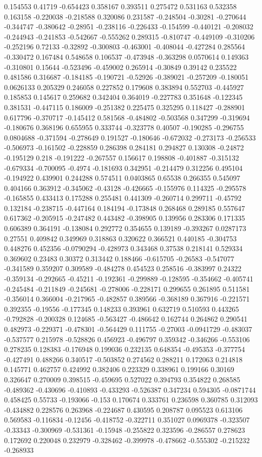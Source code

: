 0.154553 0.41719 -0.654423 0.358167 0.393511 0.275472 0.531163 0.532358 0.163158 -0.220038 -0.218588 0.320086 0.231587 -0.248504 -0.30281 -0.270644 -0.344747 -0.380642 -0.28951 -0.238116 -0.226433 -0.154599 -0.440121 -0.208032 -0.244943 -0.241853 -0.542667 -0.555262 0.289315 -0.810747 -0.449109 -0.310206 -0.252196 0.72133 -0.32892 -0.300803 -0.463001 -0.408044 -0.427284 0.285564 -0.330472 0.167484 0.548658 0.106537 -0.473948 -0.363298 0.0570614 0.149363 -0.310801 0.15644 -0.523496 -0.459002 0.265914 -0.30849 0.39142 0.235522 0.481586 0.316687 -0.184185 -0.190721 -0.52926 -0.389021 -0.257209 -0.180051 0.0626133 0.205329 0.246058 0.227852 0.179608 0.383894 0.552703 -0.445927 0.185853 0.145617 0.259682 0.342404 0.364019 -0.227783 0.351648 -0.122345 0.381531 -0.447115 0.186009 -0.251382 0.225475 0.325295 0.118427 -0.288901 0.617796 -0.370717 -0.145412 0.581568 -0.484802 -0.503568 0.347299 -0.319694 -0.180676 0.368196 0.655955 0.333744 -0.323778 0.40507 -0.190285 -0.296755 0.0804688 -0.371594 -0.278649 0.191527 -0.180646 -0.672032 -0.273173 -0.256533 -0.506973 -0.161502 -0.228859 0.286398 0.284181 0.294827 0.130308 -0.24872 -0.195129 0.218 -0.191222 -0.267557 0.156617 0.198808 -0.401887 -0.315132 -0.679334 -0.700095 -0.4974 -0.181693 0.342951 -0.214479 0.312256 0.495104 -0.194922 0.439901 0.244288 0.574511 0.0403865 0.65538 0.266355 0.545097 0.404166 0.363912 -0.345062 -0.43128 -0.426665 -0.155976 0.114325 -0.295578 -0.165855 0.433413 0.175288 0.255481 0.441309 -0.260714 0.299711 -0.45792 0.132184 -0.238715 -0.447164 0.184194 -0.173848 0.268468 0.289185 0.557647 0.617362 -0.205915 -0.247482 0.443482 -0.398905 0.139956 0.283306 0.171335 0.606389 0.364191 -0.138084 0.292772 0.354655 0.139189 -0.393267 0.0287173 0.27551 0.409842 0.349969 0.318863 0.320622 0.366521 0.440185 -0.304753 0.448276 0.452356 -0.0790294 -0.428973 0.343468 0.37538 0.218141 0.529334 0.369602 0.23483 0.30372 0.313442 0.188466 -0.615705 -0.26583 -0.547077 -0.341589 0.359207 0.309589 -0.484278 0.454523 0.258516 -0.383997 0.24322 -0.359134 -0.292665 -0.45211 -0.192361 -0.299889 -0.128595 -0.354662 -0.405741 -0.245484 -0.211849 -0.245681 -0.278006 -0.228171 0.299655 0.261895 0.511581 -0.356014 0.366004 -0.217965 -0.482857 0.389566 -0.368189 0.367916 -0.221571 0.392355 -0.19556 -0.177345 0.148233 0.393961 0.632719 0.510593 0.443265 -0.792828 -0.200328 0.124685 -0.563427 -0.486642 0.162744 0.264862 0.290541 0.482973 -0.229371 -0.478301 -0.564429 0.111755 -0.27003 -0.0941729 -0.483037 -0.537577 0.215978 -0.528826 0.456923 -0.496797 0.359342 -0.346266 -0.553106 0.278235 0.128383 -0.176948 0.199036 0.232135 0.648354 -0.495353 -0.377754 -0.427491 0.488266 0.340517 -0.503852 0.274562 0.288211 0.172063 0.214818 0.145771 0.462757 0.424992 0.382406 0.223329 0.338961 0.199166 0.30169 0.326647 0.270009 0.398515 -0.459695 0.527022 0.394793 0.354822 0.268585 -0.489362 -0.430696 -0.410893 -0.433293 -0.526387 0.347234 0.594305 -0.0871744 0.458425 0.55733 -0.193066 -0.153 0.170674 0.333761 0.236598 0.360785 0.312093 -0.434882 0.228576 0.263968 -0.224687 0.430595 0.208787 0.095523 0.613106 0.569583 -0.116834 -0.12456 -0.418752 -0.322711 0.351027 0.0969378 -0.323507 -0.33343 -0.300969 -0.531361 -0.15948 -0.255822 0.323596 -0.286557 0.278623 0.172692 0.220048 0.232979 -0.328462 -0.399978 -0.478662 -0.555302 -0.215232 -0.268933 